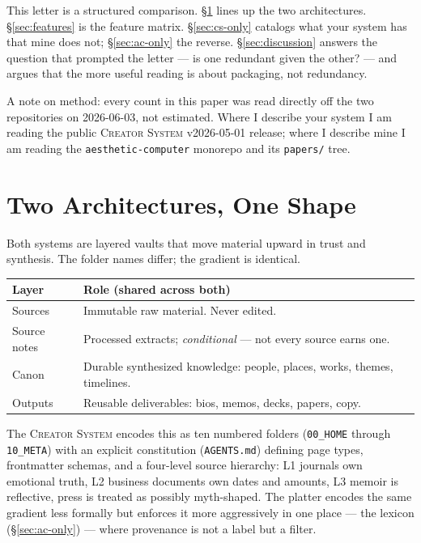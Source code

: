 \documentclass[10pt,letterpaper,twocolumn]{article}
\newcommand{\cs}{\textsc{Creator System}}
\begin{document}
This letter is a structured comparison. \S\ref{sec:arch} lines up the two architectures. \S\ref{sec:features} is the feature matrix. \S\ref{sec:cs-only} catalogs what your system has that mine does not; \S\ref{sec:ac-only} the reverse. \S\ref{sec:discussion} answers the question that prompted the letter --- is one redundant given the other? --- and argues that the more useful reading is about packaging, not redundancy.

A note on method: every count in this paper was read directly off the two repositories on \mbox{2026-06-03}, not estimated. Where I describe your system I am reading the public \cs{} v2026-05-01 release; where I describe mine I am reading the \texttt{aesthetic-computer} monorepo and its \texttt{papers/} tree.


\section{Two Architectures, One Shape}
\label{sec:arch}

Both systems are layered vaults that move material upward in trust and synthesis. The folder names differ; the gradient is identical.

\begin{center}
\footnotesize
\begin{tabularx}{\columnwidth}{@{}lX@{}}
\toprule
\textbf{Layer} & \textbf{Role (shared across both)} \\
\midrule
Sources & Immutable raw material. Never edited. \\
Source notes & Processed extracts; \emph{conditional} --- not every source earns one. \\
Canon & Durable synthesized knowledge: people, places, works, themes, timelines. \\
Outputs & Reusable deliverables: bios, memos, decks, papers, copy. \\
\bottomrule
\end{tabularx}
\end{center}

\noindent The \cs{} encodes this as ten numbered folders (\texttt{00\_HOME} through \texttt{10\_META}) with an explicit constitution (\texttt{AGENTS.md}) defining page types, frontmatter schemas, and a four-level source hierarchy: L1 journals own emotional truth, L2 business documents own dates and amounts, L3 memoir is reflective, press is treated as possibly myth-shaped. The platter encodes the same gradient less formally but enforces it more aggressively in one place --- the lexicon (\S\ref{sec:ac-only}) --- where provenance is not a label but a filter.
\end{document}
